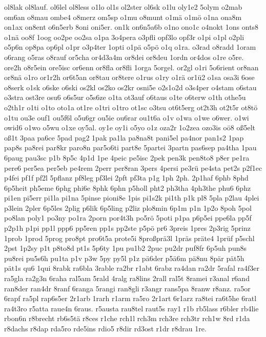 {ol8lak ol8lauf.  ol6lel ol8less o1lo 
ol1s ol2ster
ol6sk o1lu oly1e2 5olym
o2mab om6an o8mau ombe4 o8merz om5sp o1mu o8munt o1m\"a o1m\"o
o1na ona8m on1ax on8ent o6n5erb 8oni oni5er.  on1k on6n5a6b o1no ono1c
o4nokt 1ons onts8 o1n\"a oo8f 1oog oo2pe oo2sa o1pa 3o4pera o3pfli
opf3lo opf3r o1pi o1pl o2pli o5p6n op8pa op6pl o1pr o3p4ter 1opti
o1p\"a o5p\"o o1q o1ra.  o3rad o8radd 1oram o6rang o5ras o8rauf
or5cha or4d3a4m or8dei or8deu 1ordn or4dos o1re o5re.  ore2h o8r5ein
ore5isc or6enn or8fla or8fli 1orga 5orgel.  or2gl o1ri 5o6rient or8nan
or8n\"a o1ro or1r2h or6t5an or8tau or8tere o1rus o1ry o1r\"a
or1\"u2 o1sa osa3i 6ose o8serk o1sk o6ske o6ski os2kl os2ko os2kr
osni5e o2s1o2d o3s4per o4stam o6stau o3stra ost3re osu6 o6s5ur o5s6ze
o1ta ot3auf o6taus o1te o6terw o1th othe5u o2th1r o1ti o1to oto1a
ot1re o1tri o1tro ot1sc o3tsu ot6t5erg ot2t3h ot2t5r ot8t\"o o1tu
ou3e ouf1 ou5f6l o5u6gr ou5ie ou6rar ou1t6a o1v o1wa o1we o6wer.  o1wi
owid6 o1wo o5wu o1xe oy5al.  oy1e oy1i o5yo o1z oza2r 1o2zea ozo3is
o\"o8 o\ss5elt  o\ss1t  3paa pa6ce 5pad pag2 1pak
pa1la pa8na8t pani5el pa4nor pan1s2 1pap pap8s pa8rei par8kr paro8n
par5o6ti part8e 5partei 3partn pas6sep pa4tha 1pau 6paug pau3sc p1b
8p5c 4p1d 1pe 4peic pe5isc 2pek pen3k pen8to8 p8er pe1ra pere6 per5ea
per5eb pe4rem 2perr per8ran 3pers 4persi pe3r\"u pe4sta pet2s
p2f1ec p4fei pf1f pf2l 5pflanz pf8leg pf3lei 2pft pf3ta p1g 1ph 2ph.
2p1haf 6phb 8phd 6p5heit ph5eme 6phg phi6e 8phk 6phn p5holl pht2
ph3tha 4ph3the phu6 6phz pi1en pi5err pi1la pi1na 5pinse pioni8e 1pis
pi1s2k pi1th p1k pl8 5pla p2lau 4plei p3lein 2pler 6p5les 2plig p6lik
6p5ling p2liz plo8min 6p1m p1n 1p2o 8poh 5pol po8lan poly1 po3ny po1ra
2porn por4t3h po5r\"o 5poti p1pa p6p5ei ppe6la pp5f p2p1h p1pi pp1l
ppp6 pp5ren 
pp1s pp2ste
p5p\"o pr6 3preis 1pres 2p3rig 5prinz 1prob 1prod
5prog pro8pt pro6t5a prote5i 8pro\ss  pr\"a3l 1pr\"as
pr\"ate4 1pr\"uf p5schl 2pst 1p2sy p1t p8to8d pt1s 5p6ty 1pu
pu1b2 2puc pu2dr puf8fr 6p5uh pun8s pu8rei pu5s6h pu1ta p1v p3w 5py
py5l p1z p\"a6der p5\"a6m p\"a8nu 8p\"ar p\"at5h
p\"at1s qu6 1qui 8rabk ra6bla 3rable ra2br r1abt 6rabz ra4dan ra2dr
5rafal ra4f3er ra5gla ra2g3n 6raha ral5am 5rald 4ralg ra8lins 2rall
ral5t 8ramei r3anal r6and ran8der ran4dr 8ranf 6ranga 5rangi ran8gli
r3angr rans5pa 8ranw r8anz.  ra5or 6rapf ra5pl rap6s5er 2r1arb 1rarh
r1arm ra5ro 2r1art 6r1arz ra8tei ra6t5he 6ratl ra4t3ro r5atta raue4n
6raus.  r5austa rau8tel raut5s ray1 r1b rb5lass r6bler rb4lie rbon6n
r8brecht rb6s5t\"a r8ces r1che rch1l rch3m rch3re rch3tr rch1w 8rd
r1da r8dachs r8dap rda5ro rde5ins rdio5 r8dir rd3ost r1dr r8drau 1re.
}
